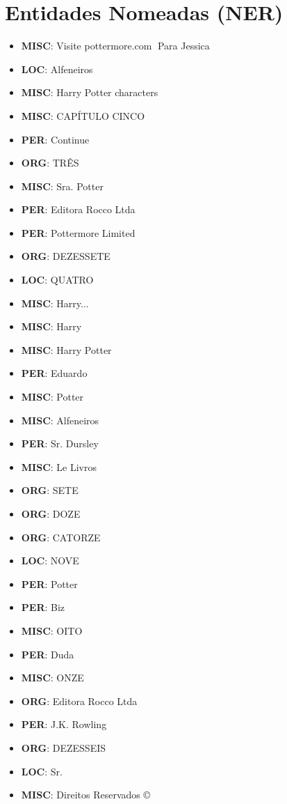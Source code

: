 \documentclass{article}
\begin{document}
\section{Entidades Nomeadas (NER)}
\begin{itemize}
\item \textbf{MISC}: Visite pottermore.com  Para Jessica
\item \textbf{LOC}: Alfeneiros
\item \textbf{MISC}: Harry Potter characters
\item \textbf{MISC}: CAPÍTULO CINCO
\item \textbf{PER}: Continue
\item \textbf{ORG}: TRÊS
\item \textbf{MISC}: Sra. Potter
\item \textbf{PER}: Editora Rocco Ltda
\item \textbf{PER}: Pottermore Limited
\item \textbf{ORG}: DEZESSETE
\item \textbf{LOC}: QUATRO
\item \textbf{MISC}: Harry... 
\item \textbf{MISC}: Harry
\item \textbf{MISC}: Harry Potter
\item \textbf{PER}: Eduardo
\item \textbf{MISC}: Potter
\item \textbf{MISC}: Alfeneiros
\item \textbf{PER}: Sr. Dursley
\item \textbf{MISC}: Le Livros
\item \textbf{ORG}: SETE
\item \textbf{ORG}: DOZE
\item \textbf{ORG}: CATORZE
\item \textbf{LOC}: NOVE
\item \textbf{PER}: Potter
\item \textbf{PER}: Biz
\item \textbf{MISC}: OITO
\item \textbf{PER}: Duda
\item \textbf{MISC}: ONZE
\item \textbf{ORG}: Editora Rocco Ltda
\item \textbf{PER}: J.K. Rowling
\item \textbf{ORG}: DEZESSEIS
\item \textbf{LOC}: Sr.
\item \textbf{MISC}: Direitos Reservados ©

\end{itemize}
\end{document}
